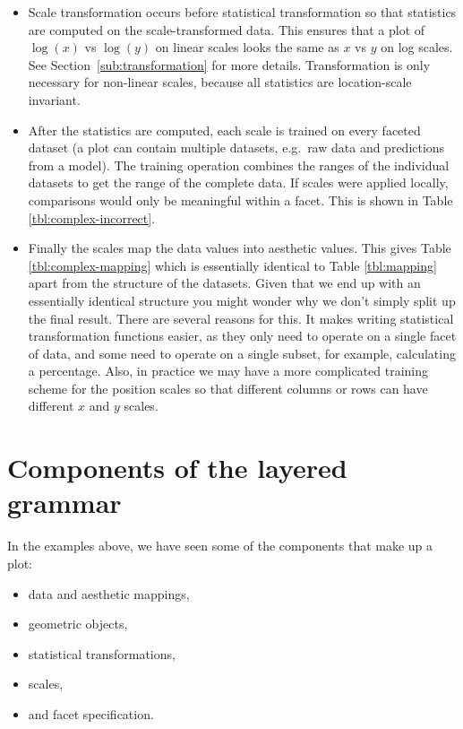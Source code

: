 \begin{itemize}
  \item  Scale transformation occurs before statistical transformation so that statistics are computed on the scale-transformed data.  This ensures that a plot of $\log(x)$ vs $\log(y)$ on linear scales looks the same as $x$ vs $y$ on log scales.  See Section~\ref{sub:transformation} for more details. Transformation is only necessary for non-linear scales, because all statistics are location-scale invariant.

  \item After the statistics are computed, each scale is trained on every faceted dataset (a plot can contain multiple datasets, e.g.\ raw data and predictions from a model).  The training operation combines the ranges of the individual datasets to get the range of the complete data.  If scales were applied locally, comparisons would only be meaningful within a facet.  This is shown in Table \ref{tbl:complex-incorrect}.

  \item Finally the scales map the data values into aesthetic values.  This gives Table \ref{tbl:complex-mapping} which is essentially identical to Table \ref{tbl:mapping} apart from the structure of the datasets.  Given that we end up with an essentially identical structure you might wonder why we don't simply split up the final result.  There are several reasons for this.  It makes writing statistical transformation functions easier, as they only need to operate on a single facet of data, and some need to operate on a single subset, for example, calculating a percentage.  Also, in practice we may have a more complicated training scheme for the position scales so that different columns or rows can have different $x$ and $y$ scales.  
  
\end{itemize}



\section{Components of the layered grammar}
\label{sec:components}

In the examples above, we have seen some of the components that make up a plot:

\begin{itemize}
  \item data and aesthetic mappings,
  \item geometric objects, 
  \item statistical transformations,
  \item scales,
  \item and facet specification.
\end{itemize}


